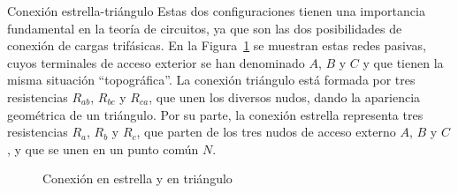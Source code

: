\documentclass[11pt]{book} %
\makeatletter
\numberwithin{dummy}{section}
\theoremstyle{ocrenumbox}
\theoremstyle{blacknumex}
\theoremstyle{blacknumbox}
\theoremstyle{ocrenum}
\renewcommand{\subsubsection}{\@startsection {subsubsection}{3}{\z@}
{-2ex \@plus -0.1ex \@minus -.2ex}
{.2ex \@plus.2ex }
{\normalfont\small\sffamily\bfseries}}
\makeatother
\begin{document}
	\subsubsection{Conexión estrella-triángulo}
	Estas dos configuraciones tienen una importancia fundamental en la teoría de circuitos, ya que son las dos posibilidades de conexión de cargas trifásicas. En la Figura~\ref{fig.estrella-triangulo} se muestran estas redes pasivas, cuyos terminales de acceso exterior
	se han denominado $A$, $B$ y $C$ y que tienen la misma situación ``topográfica''. La conexión triángulo está
	formada por tres resistencias $R_{ab}$, $R_{bc}$ y $R_{ca}$, que unen los diversos nudos, dando la apariencia
	geométrica de un triángulo. Por su parte, la conexión
	estrella representa tres resistencias $R_a$, $R_b$ y $R_c$, que parten de los tres nudos de acceso
	externo $A$, $B$ y $C$, y que se unen en un punto común $N$. 
	\begin{figure}[htbp]
		\centering
		\hfil
		\caption{Conexión en estrella y en triángulo}
		\label{fig.estrella-triangulo}
	\end{figure}
	
\end{document}
